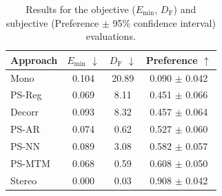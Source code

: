 \documentclass{article}
\makeatletter
\newcommand{\tabsp}{@{\hskip 0.3in}}
\newcommand{\captionspacing}{\vspace{-0.2cm}}
\newcommand{\captionspacing}{}
\makeatother
\begin{document}
\begin{table}[t]
 \begin{center}
 \begin{tabular}{l\tabsp cc\tabsp c}
  \hline\hline
  Approach & $E_{\min}$ $\downarrow$ & $D_{\text{F}}$ $\downarrow$ & Preference $\uparrow$ \\
  \hline\hline
  Mono      & 0.104 & 20.89 & 0.090 $\pm$ 0.042 \\
  PS-Reg   & 0.069 & 8.11 & 0.451 $\pm$ 0.066 \\
  Decorr   & 0.093 & 8.32 & 0.457 $\pm$ 0.064 \\
  \hline
  PS-AR    & 0.074 & 0.62 & 0.527 $\pm$ 0.060 \\
  PS-NN   & 0.089 & 3.08 & 0.582 $\pm$ 0.057 \\
  PS-MTM  & 0.068 & 0.59 & 0.608 $\pm$ 0.050 \\
  \hline
  Stereo    & 0.000 & 0.03 & 0.908 $\pm$ 0.042 \\
  \hline\hline
 \end{tabular}
\end{center}
 \captionspacing
 \caption{Results for the objective ($E_{\min}$, $D_{\text{F}}$) and subjective (Preference $\pm$ 95\% confidence interval) evaluations.}
 \label{tab:results}
\end{table}
\end{document}
